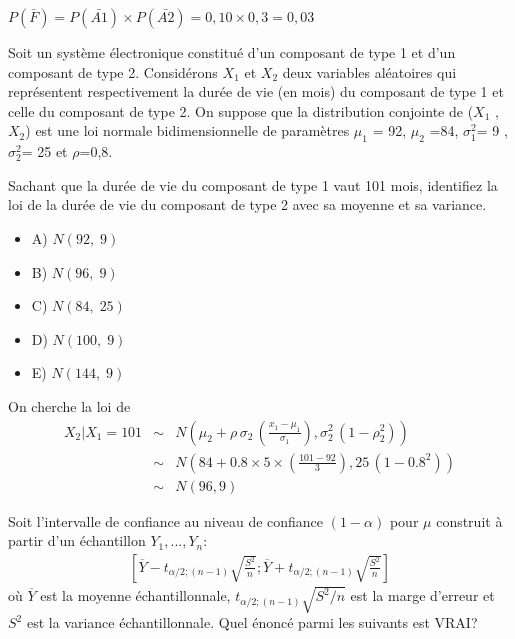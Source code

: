 \begin{questions}
\qcmrep{}


\begin{solution}
$P(\bar{F})= P(\bar{A1}) \times P(\bar{A2}) = 0,10 \times 0,3 = 0,03$
\end{solution}


\question[3]\label{normaleBivariee}
Soit un système électronique constitué d'un composant de type 1 et d'un composant de type 2. Considérons ${X}_1 $ et ${X}_2 $ deux variables aléatoires qui représentent respectivement la durée de vie (en mois) du composant de type 1 et celle du composant de type 2. On suppose que la distribution conjointe de (${X}_1 $ , ${X}_2 $) est une loi normale bidimensionnelle de paramètres ${\mu}_1 $ = 92, ${\mu}_2 $ =84, ${\sigma}_1 ^2$= 9 , ${\sigma}_2 ^2$=  25 et $\rho $=0,8.

Sachant que la durée de vie du composant de type 1 vaut 101 mois, identifiez la loi de la durée de vie du composant de type 2 avec sa moyenne et sa variance.

 \begin{itemize}[label = { }]
		\item A) $N(92, \; 9)$  %
		\item B) $N(96,\;9)$ %
		\item C) $N(84,\; 25)$ %
		\item D) $N(100, \; 9)$ %
		\item E) $N(144, \; 9)$ %
	\end{itemize}

\qcmrep{}

\begin{solution}
On cherche la loi de
		\begin{eqnarray*}
			{X}_2|{X}_1=101 &\sim& N\left(\mu_2 +\rho\, \sigma_2\, \left(\frac{x_1-\mu_1}{\sigma_1}\right),\sigma_2^2 \,\left(1-\rho_2^2\right)\right)\\
			&\sim& N\left(84 +0.8\times 5\times \left(\frac{101-92}{3}\right),25 \,\left(1-0.8^2\right)\right)\\
			&\sim& N\left(96, 9 \right)
	\end{eqnarray*}
\end{solution}


\newpage

\question[3]\label{IC}

Soit l'intervalle de confiance au niveau de confiance $(1-\alpha)$ pour $\mu$ construit à partir d'un échantillon $Y_1,...,Y_n$:
\begin{align*}
    \left[\overline{Y}- t_{\alpha/2;(n-1)}\sqrt{\frac{S^2}{n}};\overline{Y}+ t_{\alpha/2;(n-1)}\sqrt{\frac{S^2}{n}}\right]
\end{align*}
où $\overline{Y}$ est la moyenne échantillonnale, $t_{\alpha/2;(n-1)}\sqrt{S^2/n}$ est la marge d'erreur et $S^2$ est la variance échantillonnale.
Quel énoncé parmi les suivants est VRAI?


\end{questions}
